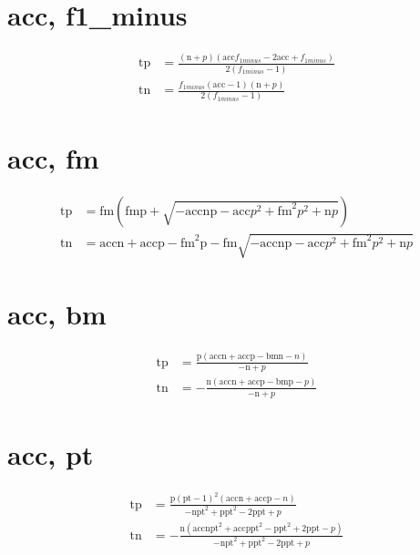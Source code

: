 \documentclass[3p,times]{elsarticle}
\begin{document}
\begin{footnotesize}
\begin{landscape}
\section{acc, f1_minus}
\begin{align}
\mathrm{tp} &= \frac{\left(\mathrm{n} + p\right) \left(\mathrm{acc} f_{1 minus} - 2 \mathrm{acc} + f_{1 minus}\right)}{2 \left(f_{1 minus} - 1\right)}\\
\mathrm{tn} &= \frac{f_{1 minus} \left(\mathrm{acc} - 1\right) \left(\mathrm{n} + p\right)}{2 \left(f_{1 minus} - 1\right)}
\end{align}
\section{acc, fm}
\begin{align}
\mathrm{tp} &= \mathrm{fm} \left(\mathrm{fm} \mathrm{p} + \sqrt{- \mathrm{acc} \mathrm{n} \mathrm{p} - \mathrm{acc} p^{2} + \mathrm{fm}^{2} p^{2} + \mathrm{n} p}\right)\\
\mathrm{tn} &= \mathrm{acc} \mathrm{n} + \mathrm{acc} \mathrm{p} - \mathrm{fm}^{2} \mathrm{p} - \mathrm{fm} \sqrt{- \mathrm{acc} \mathrm{n} \mathrm{p} - \mathrm{acc} p^{2} + \mathrm{fm}^{2} p^{2} + \mathrm{n} p}
\end{align}
\section{acc, bm}
\begin{align}
\mathrm{tp} &= \frac{\mathrm{p} \left(\mathrm{acc} \mathrm{n} + \mathrm{acc} \mathrm{p} - \mathrm{bm} \mathrm{n} - n\right)}{- \mathrm{n} + p}\\
\mathrm{tn} &= - \frac{\mathrm{n} \left(\mathrm{acc} \mathrm{n} + \mathrm{acc} \mathrm{p} - \mathrm{bm} \mathrm{p} - p\right)}{- \mathrm{n} + p}
\end{align}
\section{acc, pt}
\begin{align}
\mathrm{tp} &= \frac{\mathrm{p} \left(\mathrm{pt} - 1\right)^{2} \left(\mathrm{acc} \mathrm{n} + \mathrm{acc} \mathrm{p} - n\right)}{- \mathrm{n} \mathrm{pt}^{2} + \mathrm{p} \mathrm{pt}^{2} - 2 \mathrm{p} \mathrm{pt} + p}\\
\mathrm{tn} &= - \frac{\mathrm{n} \left(\mathrm{acc} \mathrm{n} \mathrm{pt}^{2} + \mathrm{acc} \mathrm{p} \mathrm{pt}^{2} - \mathrm{p} \mathrm{pt}^{2} + 2 \mathrm{p} \mathrm{pt} - p\right)}{- \mathrm{n} \mathrm{pt}^{2} + \mathrm{p} \mathrm{pt}^{2} - 2 \mathrm{p} \mathrm{pt} + p}
\end{align}

\end{landscape}
\end{footnotesize}
\end{document}
